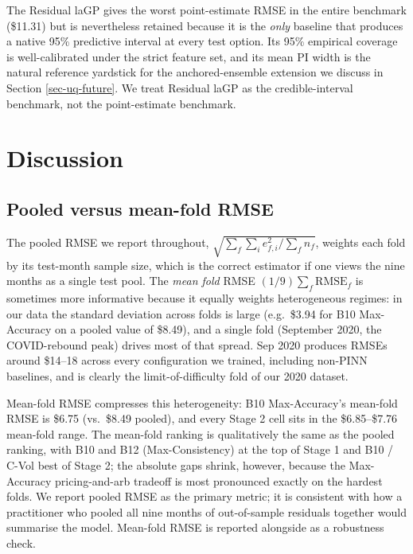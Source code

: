 \documentclass[
  11pt,
]{article}
\begin{document}
The Residual laGP gives the worst point-estimate RMSE in the entire
benchmark (\$11.31) but is nevertheless retained because it is the
\emph{only} baseline that produces a native 95\% predictive interval at
every test option. Its 95\% empirical coverage is well-calibrated under
the strict feature set, and its mean PI width is the natural reference
yardstick for the anchored-ensemble extension we discuss in Section
\ref{sec-uq-future}. We treat Residual laGP as the credible-interval
benchmark, not the point-estimate benchmark.

\pagebreak

\section{Discussion}\label{sec-discussion}

\subsection{Pooled versus mean-fold
RMSE}\label{pooled-versus-mean-fold-rmse}

The pooled RMSE we report throughout, \(\sqrt{\sum_f \sum_i e_{f,i}^2 /
\sum_f n_f}\), weights each fold by its test-month sample size, which is
the correct estimator if one views the nine months as a single test
pool. The \emph{mean fold} RMSE \((1/9)\sum_f \mathrm{RMSE}_f\) is
sometimes more informative because it equally weights heterogeneous
regimes: in our data the standard deviation across folds is large
(e.g.~\$3.94 for B10 Max-Accuracy on a pooled value of \$8.49), and a
single fold (September 2020, the COVID-rebound peak) drives most of that
spread. Sep 2020 produces RMSEs around \$14--18 across every
configuration we trained, including non-PINN baselines, and is clearly
the limit-of-difficulty fold of our 2020 dataset.

Mean-fold RMSE compresses this heterogeneity: B10 Max-Accuracy's
mean-fold RMSE is \$6.75 (vs.~\$8.49 pooled), and every Stage 2 cell
sits in the \$6.85--\$7.76 mean-fold range. The mean-fold ranking is
qualitatively the same as the pooled ranking, with B10 and B12
(Max-Consistency) at the top of Stage 1 and B10 / C-Vol best of Stage 2;
the absolute gaps shrink, however, because the Max-Accuracy
pricing-and-arb tradeoff is most pronounced exactly on the hardest
folds. We report pooled RMSE as the primary metric; it is consistent
with how a practitioner who pooled all nine months of out-of-sample
residuals together would summarise the model. Mean-fold RMSE is reported
alongside as a robustness check.
\end{document}
